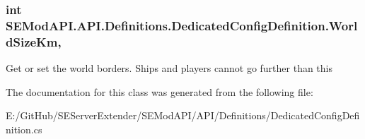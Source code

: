 \subsubsection[{World\+Size\+Km}]{\setlength{\rightskip}{0pt plus 5cm}int S\+E\+Mod\+A\+P\+I.\+A\+P\+I.\+Definitions.\+Dedicated\+Config\+Definition.\+World\+Size\+Km\hspace{0.3cm}{\ttfamily [get]}, {\ttfamily [set]}}\label{class_s_e_mod_a_p_i_1_1_a_p_i_1_1_definitions_1_1_dedicated_config_definition_af2750685c29481bb6be3f83baebf4fc7}


Get or set the world borders. Ships and players cannot go further than this 



The documentation for this class was generated from the following file\+:\begin{DoxyCompactItemize}
\item 
E\+:/\+Git\+Hub/\+S\+E\+Server\+Extender/\+S\+E\+Mod\+A\+P\+I/\+A\+P\+I/\+Definitions/Dedicated\+Config\+Definition.\+cs\end{DoxyCompactItemize}
